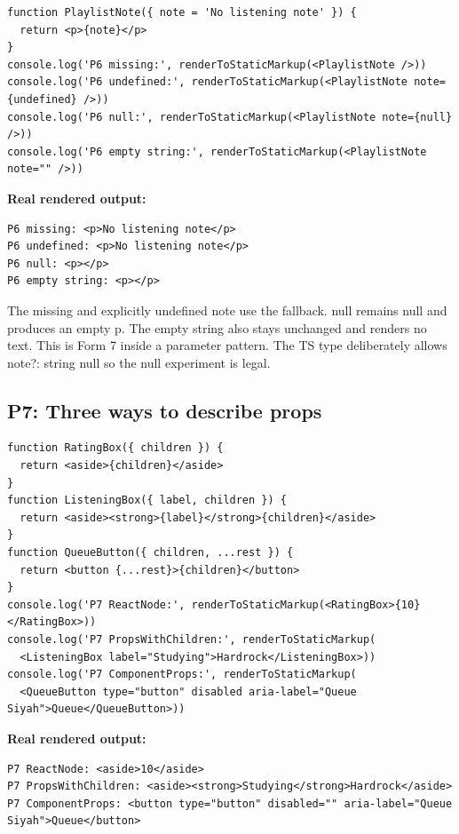 \documentclass[
  10pt,
  a4paper,
  titlepage]{article}
\begin{document}
\Needspace{82.4pt}
\begin{lstlisting}[language=JSX]
function PlaylistNote({ note = 'No listening note' }) {
  return <p>{note}</p>
}
console.log('P6 missing:', renderToStaticMarkup(<PlaylistNote />))
console.log('P6 undefined:', renderToStaticMarkup(<PlaylistNote note={undefined} />))
console.log('P6 null:', renderToStaticMarkup(<PlaylistNote note={null} />))
console.log('P6 empty string:', renderToStaticMarkup(<PlaylistNote note="" />))
\end{lstlisting}


\textbf{Real rendered output:}

\Needspace{61.8pt}
\begin{lstlisting}
P6 missing: <p>No listening note</p>
P6 undefined: <p>No listening note</p>
P6 null: <p></p>
P6 empty string: <p></p>
\end{lstlisting}

The missing and explicitly undefined note use the fallback. null remains
null and produces an empty p. The empty string also stays unchanged and
renders no text. This is Form 7 inside a parameter pattern. The TS type
deliberately allows note?: string \textbar{} null so the null experiment
is legal.

\subsection{P7: Three ways to describe
props}\label{p7-three-ways-to-describe-props}

\Needspace{82.4pt}
\begin{lstlisting}[language=JSX]
function RatingBox({ children }) {
  return <aside>{children}</aside>
}
function ListeningBox({ label, children }) {
  return <aside><strong>{label}</strong>{children}</aside>
}
function QueueButton({ children, ...rest }) {
  return <button {...rest}>{children}</button>
}
console.log('P7 ReactNode:', renderToStaticMarkup(<RatingBox>{10}</RatingBox>))
console.log('P7 PropsWithChildren:', renderToStaticMarkup(
  <ListeningBox label="Studying">Hardrock</ListeningBox>))
console.log('P7 ComponentProps:', renderToStaticMarkup(
  <QueueButton type="button" disabled aria-label="Queue Siyah">Queue</QueueButton>))
\end{lstlisting}


\textbf{Real rendered output:}

\Needspace{51.5pt}
\begin{lstlisting}
P7 ReactNode: <aside>10</aside>
P7 PropsWithChildren: <aside><strong>Studying</strong>Hardrock</aside>
P7 ComponentProps: <button type="button" disabled="" aria-label="Queue Siyah">Queue</button>
\end{lstlisting}
\end{document}
